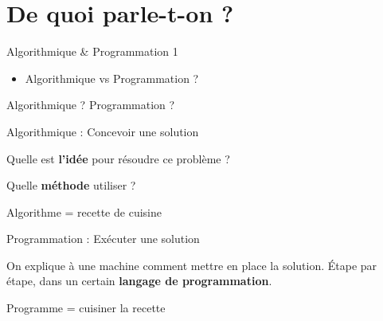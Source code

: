 \documentclass{beamer}
\begin{document}
\section{De quoi parle-t-on ?}

\begin{frame}{Algorithmique \& Programmation 1}
\begin{itemize}
\item Algorithmique vs Programmation ?
\end{itemize}
\end{frame}


\begin{frame}{Algorithmique ? Programmation ? }

    \begin{block}{Algorithmique : Concevoir une solution}
      \vspace{0pt}

        Quelle est \textbf{l'idée} pour résoudre ce problème ?

        Quelle \textbf{méthode} utiliser ?
    \end{block}
    \pause
    \begin{center}
        Algorithme = recette de cuisine
    \end{center}

    \begin{block}{Programmation : Exécuter une solution}
      \vspace{0pt}

    On \og explique \fg{} à une machine comment mettre en place la solution.
    Étape par étape, dans un certain \textbf{langage de programmation}.
    \end{block}

    \pause
    \begin{center}
        Programme = cuisiner la recette
    \end{center}
\end{frame}


\end{document}
